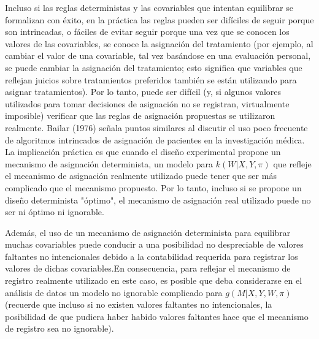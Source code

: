 \documentclass[12pt,a4paper]{article}
\begin{document}
Incluso si las reglas deterministas y las covariables que intentan equilibrar se formalizan con éxito, en la práctica las reglas pueden ser difíciles de seguir porque son intrincadas, o fáciles de evitar seguir porque una vez que se conocen los valores de las covariables, se conoce la asignación del tratamiento (por ejemplo, al cambiar el valor de una covariable, tal vez basándose en una evaluación personal, se puede cambiar la asignación del tratamiento; esto significa que variables que reflejan juicios sobre tratamientos preferidos también se están utilizando para asignar tratamientos).  Por lo tanto, puede ser difícil (y, si algunos valores utilizados para tomar decisiones de asignación no se registran, virtualmente imposible) verificar que las reglas de asignación propuestas se utilizaron realmente. Bailar (1976) señala puntos similares al discutir el uso poco frecuente de algoritmos intrincados de asignación de pacientes en la investigación médica.  La implicación práctica es que cuando el diseño experimental propone un mecanismo de asignación determinista, un modelo para $k(W|X,Y,\pi)$ que refleje el mecanismo de asignación realmente utilizado puede tener que ser más complicado que el mecanismo propuesto. Por lo tanto, incluso si se propone un diseño determinista "óptimo", el mecanismo de asignación real utilizado puede no ser ni óptimo ni ignorable. 

Además, el uso de un mecanismo de asignación determinista para equilibrar muchas covariables puede conducir a una posibilidad no despreciable de valores faltantes no intencionales debido a la contabilidad requerida para registrar los valores de dichas covariables.En consecuencia, para reflejar el mecanismo de registro realmente utilizado en este caso, es posible que deba considerarse en el análisis de datos un modelo no ignorable complicado para $g(M|X,Y,W,\pi)$ (recuerde que incluso si no existen valores faltantes no intencionales, la posibilidad de que pudiera haber habido valores faltantes hace que el mecanismo de registro sea no ignorable).
\end{document}
